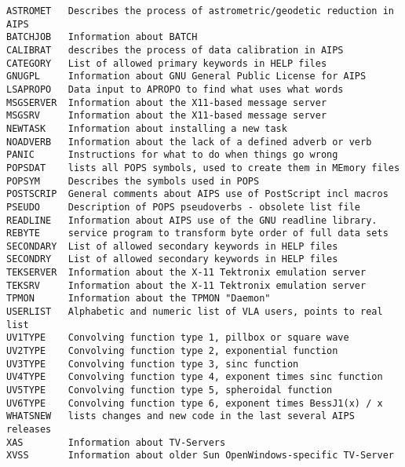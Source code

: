 \vskip 0.5pt
\bbve\begin{verbatim}
ASTROMET   Describes the process of astrometric/geodetic reduction in AIPS
BATCHJOB   Information about BATCH
CALIBRAT   describes the process of data calibration in AIPS
CATEGORY   List of allowed primary keywords in HELP files
GNUGPL     Information about GNU General Public License for AIPS
LSAPROPO   Data input to APROPO to find what uses what words
MSGSERVER  Information about the X11-based message server
MSGSRV     Information about the X11-based message server
NEWTASK    Information about installing a new task
NOADVERB   Information about the lack of a defined adverb or verb
PANIC      Instructions for what to do when things go wrong
POPSDAT    lists all POPS symbols, used to create them in MEmory files
POPSYM     Describes the symbols used in POPS
POSTSCRIP  General comments about AIPS use of PostScript incl macros
PSEUDO     Description of POPS pseudoverbs - obsolete list file
READLINE   Information about AIPS use of the GNU readline library.
REBYTE     service program to transform byte order of full data sets
SECONDARY  List of allowed secondary keywords in HELP files
SECONDRY   List of allowed secondary keywords in HELP files
TEKSERVER  Information about the X-11 Tektronix emulation server
TEKSRV     Information about the X-11 Tektronix emulation server
TPMON      Information about the TPMON "Daemon"
USERLIST   Alphabetic and numeric list of VLA users, points to real list
UV1TYPE    Convolving function type 1, pillbox or square wave
UV2TYPE    Convolving function type 2, exponential function
UV3TYPE    Convolving function type 3, sinc function
UV4TYPE    Convolving function type 4, exponent times sinc function
UV5TYPE    Convolving function type 5, spheroidal function
UV6TYPE    Convolving function type 6, exponent times BessJ1(x) / x
WHATSNEW   lists changes and new code in the last several AIPS releases
XAS        Information about TV-Servers
XVSS       Information about older Sun OpenWindows-specific TV-Server
\end{verbatim}\eve



